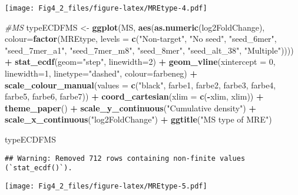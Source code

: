 \documentclass[
]{article}
\newenvironment{Shaded}{\begin{snugshade}}{\end{snugshade}}
\newcommand{\AttributeTok}[1]{\textcolor[rgb]{0.13,0.29,0.53}{#1}}
\newcommand{\CommentTok}[1]{\textcolor[rgb]{0.56,0.35,0.01}{\textit{#1}}}
\newcommand{\DecValTok}[1]{\textcolor[rgb]{0.00,0.00,0.81}{#1}}
\newcommand{\FunctionTok}[1]{\textcolor[rgb]{0.13,0.29,0.53}{\textbf{#1}}}
\newcommand{\NormalTok}[1]{#1}
\newcommand{\OtherTok}[1]{\textcolor[rgb]{0.56,0.35,0.01}{#1}}
\newcommand{\SpecialCharTok}[1]{\textcolor[rgb]{0.81,0.36,0.00}{\textbf{#1}}}
\newcommand{\StringTok}[1]{\textcolor[rgb]{0.31,0.60,0.02}{#1}}
\begin{document}
\texttt{[image: Fig4\_2\_files/figure-latex/MREtype-4.pdf]}

\begin{Shaded}
\begin{Highlighting}[]
\CommentTok{\#MS}
\NormalTok{typeECDFMS }\OtherTok{\textless{}{-}} \FunctionTok{ggplot}\NormalTok{(MS, }\FunctionTok{aes}\NormalTok{(}\FunctionTok{as.numeric}\NormalTok{(log2FoldChange), }
                              \AttributeTok{colour=}\FunctionTok{factor}\NormalTok{(MREtype, }\AttributeTok{levels =} \FunctionTok{c}\NormalTok{(}\StringTok{"Non{-}target"}\NormalTok{, }\StringTok{"No seed"}\NormalTok{, }\StringTok{"seed\_6mer"}\NormalTok{, }\StringTok{"seed\_7mer\_a1"}\NormalTok{, }\StringTok{"seed\_7mer\_m8"}\NormalTok{, }\StringTok{"seed\_8mer"}\NormalTok{, }\StringTok{"seed\_alt\_38"}\NormalTok{, }\StringTok{"Multiple"}\NormalTok{)))) }\SpecialCharTok{+} 
  \FunctionTok{stat\_ecdf}\NormalTok{(}\AttributeTok{geom=}\StringTok{"step"}\NormalTok{, }\AttributeTok{linewidth=}\DecValTok{2}\NormalTok{) }\SpecialCharTok{+}
  \FunctionTok{geom\_vline}\NormalTok{(}\AttributeTok{xintercept =} \DecValTok{0}\NormalTok{, }\AttributeTok{linewidth=}\DecValTok{1}\NormalTok{, }\AttributeTok{linetype=}\StringTok{"dashed"}\NormalTok{, }\AttributeTok{colour=}\NormalTok{farbeneg) }\SpecialCharTok{+}
  \FunctionTok{scale\_colour\_manual}\NormalTok{(}\AttributeTok{values =} \FunctionTok{c}\NormalTok{(}\StringTok{"black"}\NormalTok{, farbe1, farbe2, farbe3, farbe4, farbe5, farbe6, farbe7)) }\SpecialCharTok{+}
  \FunctionTok{coord\_cartesian}\NormalTok{(}\AttributeTok{xlim =} \FunctionTok{c}\NormalTok{(}\SpecialCharTok{{-}}\NormalTok{xlim, xlim)) }\SpecialCharTok{+} 
  \FunctionTok{theme\_paper}\NormalTok{() }\SpecialCharTok{+}
  \FunctionTok{scale\_y\_continuous}\NormalTok{(}\StringTok{"Cumulative density"}\NormalTok{) }\SpecialCharTok{+} \FunctionTok{scale\_x\_continuous}\NormalTok{(}\StringTok{"log2FoldChange"}\NormalTok{) }\SpecialCharTok{+}
  \FunctionTok{ggtitle}\NormalTok{(}\StringTok{"MS type of MRE"}\NormalTok{)}

\NormalTok{typeECDFMS}
\end{Highlighting}
\end{Shaded}

\begin{verbatim}
## Warning: Removed 712 rows containing non-finite values (`stat_ecdf()`).
\end{verbatim}

\texttt{[image: Fig4\_2\_files/figure-latex/MREtype-5.pdf]}
\end{document}
